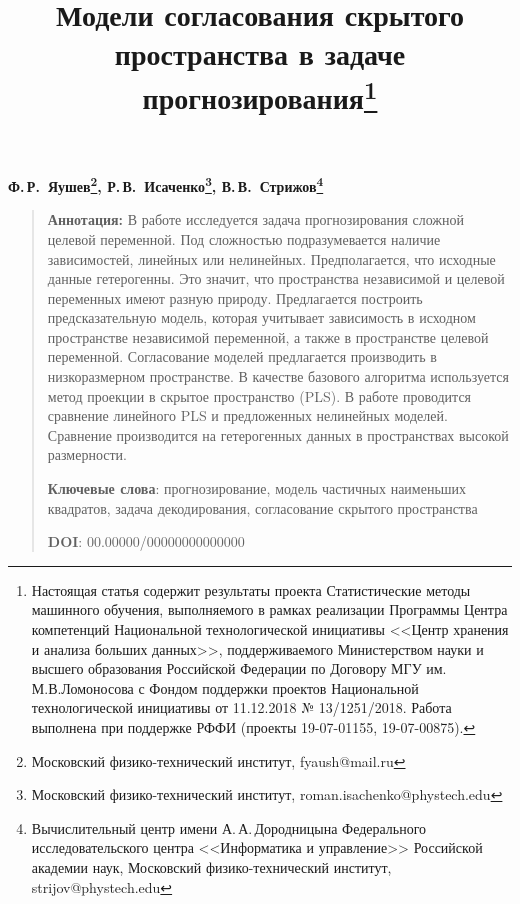 \documentclass[12pt]{article}
\begin{document}
	\title{Модели согласования скрытого пространства в задаче прогнозирования\thanks{Настоящая статья содержит результаты проекта Статистические методы машинного обучения, выполняемого в рамках реализации Программы Центра компетенций Национальной технологической инициативы <<Центр хранения и анализа больших данных>>, поддерживаемого Министерством науки и высшего образования Российской Федерации по Договору МГУ им. М.В.Ломоносова с Фондом поддержки проектов Национальной технологической инициативы от 11.12.2018 № 13/1251/2018. Работа выполнена при поддержке РФФИ (проекты 19-07-01155, 19-07-00875).}}
	\date{}
	\author{}
	\maketitle
	
	\begin{center}
		\bf
		Ф.\,Р.~Яушев\footnote{Московский физико-технический институт, fyaush@mail.ru}, 
		Р.\,В.~Исаченко\footnote{Московский физико-технический институт, roman.isachenko@phystech.edu}, 
		В.\,В.~Стрижов\footnote{Вычислительный центр имени А.\,А.\,Дородницына Федерального исследовательского центра <<Информатика и управление>> Российской академии наук, Московский физико-технический институт, strijov@phystech.edu}
	\end{center}
	{\begin{quote}
			\textbf{Аннотация:}
			В работе исследуется задача прогнозирования сложной целевой переменной. 
			Под сложностью подразумевается наличие зависимостей, линейных или нелинейных. Предполагается, что исходные данные гетерогенны. Это значит, что пространства независимой и целевой переменных имеют разную природу. Предлагается построить предсказательную модель, которая учитывает зависимость в исходном пространстве независимой переменной, а также в пространстве целевой переменной. Согласование моделей предлагается производить в низкоразмерном пространстве. В качестве базового алгоритма используется метод проекции в скрытое пространство (PLS). В работе проводится сравнение линейного PLS и предложенных нелинейных моделей. Сравнение производится на гетерогенных данных в пространствах высокой размерности.
			
			\smallskip
			\textbf{Ключевые слова}: прогнозирование, модель частичных наименьших квадратов, задача декодирования, согласование скрытого пространства
			\smallskip
			
			\textbf{DOI}: 00.00000/00000000000000
		\end{quote}
	}
\end{document}
